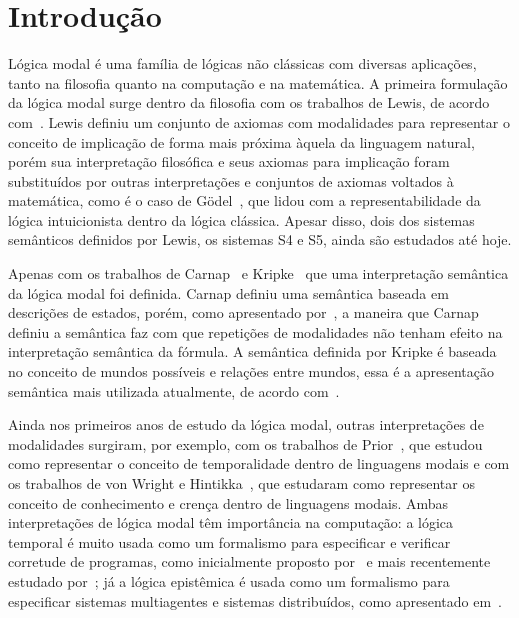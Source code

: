 \chapter{Introdução}
\label{cap:Introducao}
	Lógica modal é uma família de lógicas não clássicas com diversas aplicações, tanto na filosofia quanto na computação e na matemática.
	A primeira formulação da lógica modal surge dentro da filosofia com os trabalhos de Lewis, de acordo com~.
	Lewis definiu um conjunto de axiomas com modalidades para representar o conceito de implicação de forma mais próxima àquela da
	linguagem natural, porém sua interpretação filosófica e seus axiomas para implicação foram substituídos por outras interpretações
	e conjuntos de axiomas voltados à matemática, como é o caso de Gödel~\cite{godel1986interpretation}, que lidou com a
	representabilidade da lógica intuicionista dentro da lógica clássica. Apesar disso, dois dos sistemas semânticos definidos por Lewis,
	os sistemas S4 e S5, ainda são estudados até hoje.

	Apenas com os trabalhos de Carnap~\cite{carnap1942introduction} e Kripke~\cite{kripke1959completeness,kripke1963semantical} que
	uma interpretação semântica da lógica modal foi definida. Carnap definiu uma semântica baseada em descrições de estados,
	porém, como apresentado por~, a maneira que Carnap definiu a semântica faz com que repetições de modalidades
	não tenham efeito na interpretação semântica da fórmula. A semântica definida por Kripke é baseada no conceito de mundos possíveis
	e relações entre mundos, essa é a apresentação semântica mais utilizada atualmente, de acordo com~.

	Ainda nos primeiros anos de estudo da lógica modal, outras interpretações de modalidades surgiram, por exemplo, com os trabalhos
	de Prior~\cite{prior1957time,prior1967past}, que estudou como representar o conceito de temporalidade dentro de linguagens modais e com
	os trabalhos de von Wright e Hintikka~\cite{vonwright1951essay,hintikka1962knowledge}, que estudaram como representar os conceito de
	conhecimento e crença dentro de linguagens modais. Ambas interpretações de lógica modal têm importância na computação: a lógica temporal
	é muito usada como um formalismo para especificar e verificar corretude de programas, como inicialmente proposto por~
	e mais recentemente estudado por~; já a lógica epistêmica é usada como um formalismo para especificar sistemas
	multiagentes e sistemas distribuídos, como apresentado em~.


